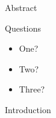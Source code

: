 \documentclass[gray]{subdocuments/open_science_poster}\usepackage{graphicx, color}
\begin{document}
%







%

\begin{frame}[t]
	\begin{columns}[t] 
		\begin{column}{0.28\paperwidth} 

			\begin{alertblock}{Abstract}
				\lipsum[1]
			\end{alertblock}

			\begin{alertblock}{Questions}
				\begin{itemize}
					\item One?
					\item Two?
					\item Three?
				\end{itemize}
			\end{alertblock}

			\begin{block}{Introduction}
				\lipsum[1-2]	
			\end{block}


\end{column}
\end{columns}
\end{frame}
\end{document}
